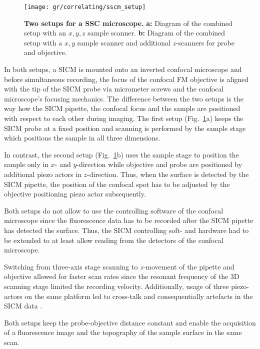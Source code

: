 \begin{figure}
  \centering
  \texttt{[image: gr/correlating/sscm\_setup]}

  \caption{%
    \textbf{Two setups for a SSC microscope.}
    \textbf{a:} Diagram of the combined setup with an $x,y,z$ sample scanner.
    \textbf{b:} Diagram of the combined setup with a $x,y$ sample scanner and
    additional $z$-scanners for probe and objective. 
  }
  \label{fig:sscm_setup}
\end{figure}

In both setups, a SICM is mounted onto an inverted confocal microscope and
before simultaneous recording, the focus of the confocal FM objective is
aligned with the tip of the SICM probe via micrometer screws and the confocal
microscope's focusing mechanics. The
difference between the two setups is the way how the SICM pipette, the
confocal focus and the sample are positioned with respect to each other during
imaging. The
first setup (Fig.~\ref{fig:sscm_setup}a) keeps the 
SICM probe at a fixed position and scanning is performed by the sample
stage which positions the sample in all three dimensions.

In contrast, the second setup (Fig.~\ref{fig:sscm_setup}b) uses the sample
stage to position the sample only in $x$- and $y$-direction while objective
and probe are positioned by additional piezo actors in $z$-direction. Thus,
when the surface is detected by the SICM pipette, the position of the confocal
spot has to be adjusted by the objective positioning piezo actor subsequently.

Both setups do not allow to use the controlling software of the confocal
microscope since the fluorescence data has to be recorded after the SICM
pipette has detected the surface. Thus, the SICM controlling soft- and
hardware had to be extended to at least allow reading from the detectors of
the confocal microscope. 

Switching from three-axis stage scanning to $z$-movement of the pipette and
objective allowed for faster scan rates since the resonant frequency of the 3D
scanning stage limited the recording velocity. Additionally, usage of three
piezo-actors on the same platform led to cross-talk and consequentially
artefacts in the SICM data \cite{Shevchuk2013}.


Both setups keep the probe-objective distance constant and enable the
acquisition of a fluorescence image and the topography of the sample surface in
the same scan.

